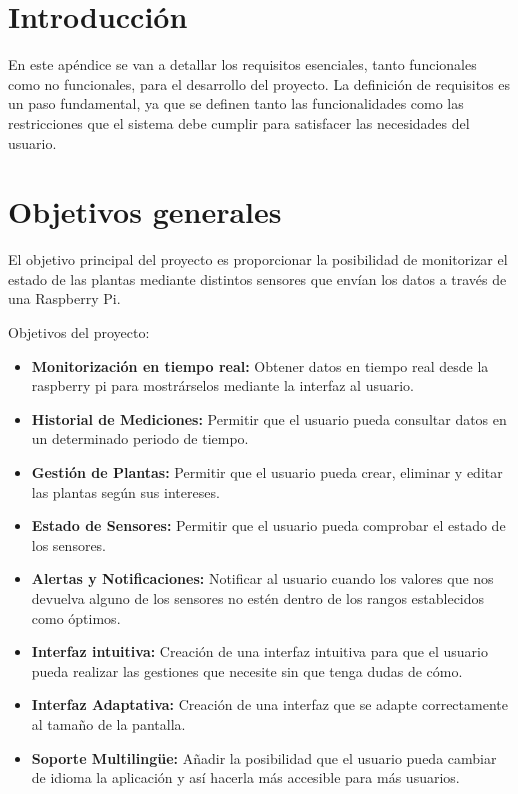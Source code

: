 
\section{Introducción}
En este apéndice se van a detallar los requisitos esenciales, tanto funcionales como no funcionales, para el desarrollo del proyecto. La definición de requisitos es un paso fundamental, ya que se definen tanto las funcionalidades como las restricciones que el sistema debe cumplir para satisfacer las necesidades del usuario.

\section{Objetivos generales}
El objetivo principal del proyecto es proporcionar la posibilidad de monitorizar el estado de las plantas mediante distintos sensores que envían los datos a través de una Raspberry Pi.

Objetivos del proyecto:
    \begin{itemize}
        \item \textbf{Monitorización en tiempo real:} Obtener datos en tiempo real desde la raspberry pi para mostrárselos mediante la interfaz al usuario.
        \item \textbf{Historial de Mediciones:} Permitir que el usuario pueda consultar datos en un determinado periodo de tiempo.
        \item \textbf{Gestión de Plantas:} Permitir que el usuario pueda crear, eliminar y editar las plantas según sus intereses.
        \item \textbf{Estado de Sensores:} Permitir que el usuario pueda comprobar el estado de los sensores.
        \item \textbf{Alertas y Notificaciones:} Notificar al usuario cuando los valores que nos devuelva alguno de los sensores no estén dentro de los rangos establecidos como óptimos.
        \item \textbf{Interfaz intuitiva:} Creación de una interfaz intuitiva para que el usuario pueda realizar las gestiones que necesite sin que tenga dudas de cómo.
        \item \textbf{Interfaz Adaptativa:} Creación de una interfaz que se adapte correctamente al tamaño de la pantalla.
        \item \textbf{Soporte Multilingüe:} Añadir la posibilidad que el usuario pueda cambiar de idioma la aplicación y así hacerla más accesible para más usuarios.
    \end{itemize}


